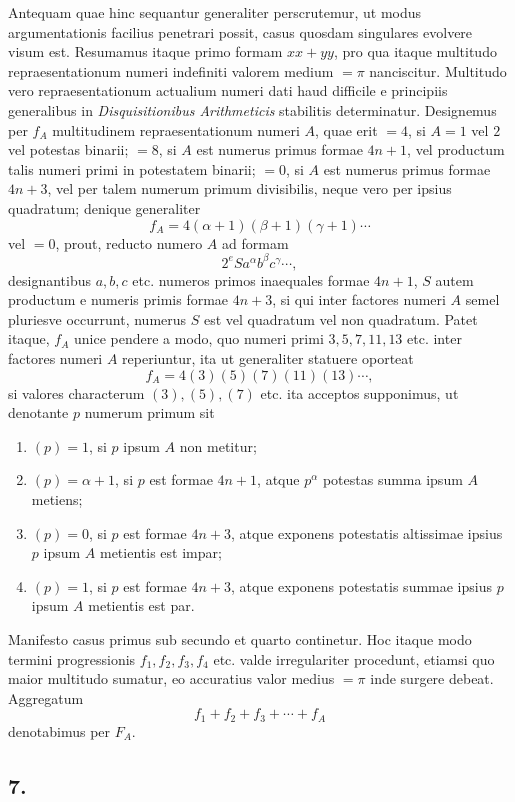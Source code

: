 \documentclass[12pt]{article}
\begin{document}
Antequam quae hinc sequantur generaliter perscrutemur, ut modus argumentationis facilius penetrari possit, casus quosdam singulares evolvere visum est. Resumamus itaque primo formam $xx+yy$, pro qua itaque multitudo repraesentationum numeri indefiniti valorem medium $=\pi$ nanciscitur. Multitudo vero repraesentationum actualium numeri dati haud difficile e principiis generalibus in \emph{Disquisitionibus Arithmeticis} stabilitis determinatur. Designemus per $f_A$ multitudinem repraesentationum numeri $A$, quae erit $=4$, si $A=1$ vel $2$ vel potestas binarii; $=8$, si $A$ est numerus primus formae $4n+1$, vel productum talis numeri primi in potestatem binarii; $=0$, si $A$ est numerus primus formae $4n+3$, vel per talem numerum primum divisibilis, neque vero per ipsius quadratum; denique generaliter
\[
f_A=4(\alpha+1)(\beta+1)(\gamma+1)\cdots
\]
vel $=0$, prout, reducto numero $A$ ad formam
\[
2^e S a^\alpha b^\beta c^\gamma\cdots,
\]
designantibus $a,b,c$ etc. numeros primos inaequales formae $4n+1$, $S$ autem productum e numeris primis formae $4n+3$, si qui inter factores numeri $A$ semel pluriesve occurrunt, numerus $S$ est vel quadratum vel non quadratum. Patet itaque, $f_A$ unice pendere a modo, quo numeri primi $3,5,7,11,13$ etc. inter factores numeri $A$ reperiuntur, ita ut generaliter statuere oporteat
\[
f_A=4(3)(5)(7)(11)(13)\cdots,
\]
si valores characterum $(3),(5),(7)$ etc. ita acceptos supponimus, ut denotante $p$ numerum primum sit

\begin{enumerate}[label=\textit{\roman*.},leftmargin=2.2em]
\item $(p)=1$, si $p$ ipsum $A$ non metitur;
\item $(p)=\alpha+1$, si $p$ est formae $4n+1$, atque $p^\alpha$ potestas summa ipsum $A$ metiens;
\item $(p)=0$, si $p$ est formae $4n+3$, atque exponens potestatis altissimae ipsius $p$ ipsum $A$ metientis est impar;
\item $(p)=1$, si $p$ est formae $4n+3$, atque exponens potestatis summae ipsius $p$ ipsum $A$ metientis est par.
\end{enumerate}

Manifesto casus primus sub secundo et quarto continetur. Hoc itaque modo termini progressionis $f_1,f_2,f_3,f_4$ etc. valde irregulariter procedunt, etiamsi quo maior multitudo sumatur, eo accuratius valor medius $=\pi$ inde surgere debeat. Aggregatum
\[
f_1+f_2+f_3+\cdots+f_A
\]
denotabimus per $F_A$.

\subsection*{7.}
\end{document}
